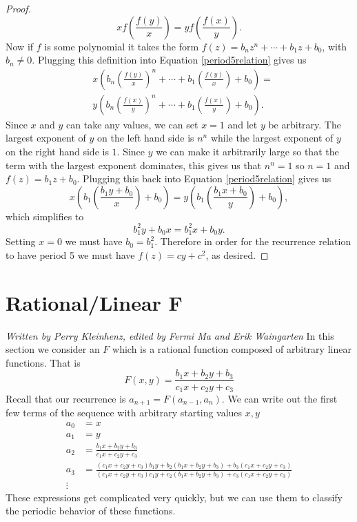 \documentclass[12pt]{article}
\begin{document}
\begin{proof}
\begin{equation}
\label{period5relation}
xf\left(\frac{f(y)}{x}\right) = y f\left(\frac{f(x)}{y}\right).
\end{equation}
Now if $f$ is some polynomial it takes the form $f(z) = b_n z^n + \cdots + b_1 z + b_0$, with $b_n \neq 0$. Plugging this definition into Equation \ref{period5relation} gives us 
\begin{align*}
&x\left( b_n \left( \frac{f(y)}{x}\right)^n + \cdots + b_1 \left( \frac{f(y)}{x}\right) + b_0 \right) = \\
& y\left( b_n \left( \frac{f(x)}{y}\right)^n + \cdots + b_1 \left( \frac{f(x)}{y}\right) + b_0 \right). 
\end{align*}
Since $x$ and $y$ can take any values, we can set $x=1$ and let $y$ be arbitrary. The largest exponent of $y$ on the left hand side is $n^n$ while the largest exponent of $y$ on the right hand side is $1$. Since $y$ we can make it arbitrarily large so that the term with the largest exponent dominates, this gives us that $n^n=1$ so $n=1$ and $f(z) =b_1 z + b_0$. Plugging this back into Equation \ref{period5relation} gives us 
\begin{equation*}
x\left(b_1 \left( \frac{b_1 y + b_0}{x} \right) + b_0 \right) = y\left(b_1 \left( \frac{b_1 x + b_0}{y} \right) + b_0 \right),
\end{equation*}
which simplifies to 
\begin{equation*}
b_1^2 y + b_0 x = b_1^2 x + b_0 y.
\end{equation*}
Setting $x=0$ we must have $b_0=b_1^2$. Therefore in order for the recurrence relation to have period 5 we must have $f(z)=cy+c^2$, as desired. 
\end{proof}

\section{Rational/Linear F}
\emph{Written by Perry Kleinhenz, edited by Fermi Ma and Erik Waingarten}
In this section we consider an $F$ which is a rational function composed of arbitrary linear functions. That is 
\begin{equation}
\label{rationallinear}
F(x,y) = \frac{ b_1 x + b_2 y + b_3}{ c_1 x+ c_2 y + c_3}
\end{equation}
Recall that our recurrence is $a_{n+1} = F( a_{n-1}, a_n)$. We can write out the first few terms of the sequence with arbitrary starting values $x,y$
\begin{align}
a_0 &= x \\ 
a_1 &=y \\
a_2 &= \frac{ b_1 x + b_2 y + b_3}{ c_1 x+ c_2 y + c_3}\\
\label{athree}a_3 &= \frac{(c_1 x+ c_2 y + c_3) b_1 y + b_2 (b_1 x + b_2 y + b_3)+ b_3(c_1 x+ c_2 y + c_3)}{ (c_1 x+ c_2 y + c_3)c_1 y+ c_2 (b_1 x + b_2 y + b_3) + c_3(c_1 x+ c_2 y + c_3)} \\
\vdots
\end{align}
These expressions get complicated very quickly, but we can use them to classify the periodic behavior of these functions.
\end{document}
